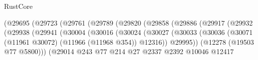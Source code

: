 \begin{lexlean}{RustCore}
\begin{coremodule}
                                              (@29695
                                                (@29723
                                                  (@29761
                                                    (@29789
                                                      (@29820
                                                        (@29858
                                                          (@29886
                                                            (@29917
                                                              (@29932
                                                                (@29938
                                                                  (@29941
                                                                    (@30004
                                                                      (@30016
                                                                        (@30024
                                                                          (@30027
                                                                            (@30033
                                                                              (@30036
                                                                                (@30071
                                                                                  (@11961 @30072)
                                                                                  (@11966
                                                                                    (@11968 @354))
                                                                                  @12316))
                                                                              @29995))
                                                                          (@12278
                                                                            (@19503 @77 @5800)))
                                                                        (@29014
                                                                          @243
                                                                          @77
                                                                          @214
                                                                          @27
                                                                          @2337
                                                                          @2392
                                                                          @10046
                                                                          @12417

\end{coremodule}
\end{lexlean}
